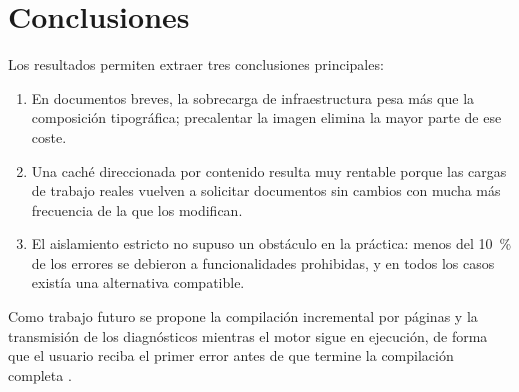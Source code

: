 \section{Conclusiones}
Los resultados permiten extraer tres conclusiones principales:

\begin{enumerate}
  \item En documentos breves, la sobrecarga de infraestructura pesa más que
    la composición tipográfica; precalentar la imagen elimina la mayor parte
    de ese coste.
  \item Una caché direccionada por contenido resulta muy rentable porque las
    cargas de trabajo reales vuelven a solicitar documentos sin cambios con
    mucha más frecuencia de la que los modifican.
  \item El aislamiento estricto no supuso un obstáculo en la práctica: menos
    del 10~\% de los errores se debieron a funcionalidades prohibidas, y en
    todos los casos existía una alternativa compatible.
\end{enumerate}

Como trabajo futuro se propone la compilación incremental por páginas y la
transmisión de los diagnósticos mientras el motor sigue en ejecución, de
forma que el usuario reciba el primer error antes de que termine la
compilación completa \citep{knuth1986}.
